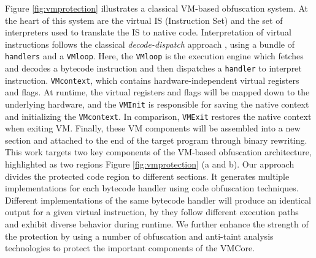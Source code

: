 Figure \ref{fig:vmprotection} illustrates a classical VM-based obfuscation system.
At the heart of this system are the virtual IS (Instruction Set) and the set of interpreters used
to translate the IS to native code.
Interpretation of virtual instructions follows the classical \textit{decode-dispatch} approach \cite{ghosh2012replacement},
using a bundle of \texttt{handlers} and a \texttt{VMloop}.
Here, the \texttt{VMloop} is the execution engine which fetches and decodes a bytecode instruction
and then dispatches a \texttt{handler} to interpret instruction.
\texttt{VMcontext}, which contains hardware-independent virtual registers and flags.
At runtime, the virtual registers and flags will be mapped down to the underlying hardware,
and the \texttt{VMInit} is responsible for saving the native context and initializing the \texttt{VMcontext}.
In comparison, \texttt{VMExit} restores the native context when exiting VM.
Finally, these VM components will be assembled into a new section and attached to
the end of the target program through binary rewriting.
This work targets two key components of the VM-based obfuscation architecture,
highlighted as two regions Figure \ref{fig:vmprotection} (a and b).
Our approach divides the protected code region to different sections.
It generates multiple implementations for each bytecode handler using code obfuscation techniques.
Different implementations of the same bytecode handler will produce an identical output for a given virtual instruction,
by they follow different execution paths and exhibit diverse behavior during runtime.
We further enhance the strength of the protection by using a number of obfuscation
and anti-taint analysis technologies to protect the important components of the VMCore.



